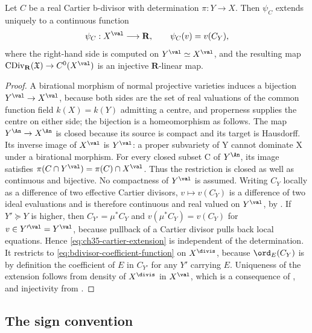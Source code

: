 \begin{proposition}
\label{prop:ch35-cartier-continuous-extension}
Let $C$ be a real Cartier b-divisor with determination
$\pi:Y\to X$.  Then $\psi_C$ extends uniquely to a continuous function
\begin{equation}
\label{eq:ch35-cartier-extension}
 \psi_C:X^{\val}\longrightarrow\mathbf R,
 \qquad
 \psi_C(v)=v(C_Y),
\end{equation}
where the right-hand side is computed on $Y^{\val}\simeq X^{\val}$, and
the resulting map
$\operatorname{CDiv}_{\mathbf R}(\mathfrak X)\to C^0(X^{\val})$ is an
injective $\mathbf R$-linear map.
\end{proposition}

\begin{proof}
A birational morphism of normal projective varieties induces a bijection
$Y^{\val}\to X^{\val}$, because both sides are the set of real valuations
of the common function field $k(X)=k(Y)$ admitting a centre, and
properness supplies the centre on either side; the bijection is a homeomorphism as follows. The map
$Y^{\An}\to X^{\An}$ is closed because its source is compact and its
target is Hausdorff. Its inverse image of $X^{\val}$ is $Y^{\val}$:
a proper subvariety of Y cannot dominate X under a birational morphism.
For every closed subset C of $Y^{\An}$, its image satisfies
$\pi(C\cap Y^{\val})=\pi(C)\cap X^{\val}$. Thus the restriction is
closed as well as continuous and bijective. No compactness of
$Y^{\val}$ is assumed.  Writing $C_Y$ locally as a
difference of two effective Cartier divisors, $v\mapsto v(C_Y)$ is a
difference of two ideal evaluations and is therefore continuous and real
valued on $Y^{\val}$, by
.  If $Y'\succeq Y$ is higher, then
$C_{Y'}=\mu^*C_Y$ and $v(\mu^*C_Y)=v(C_Y)$ for
$v\in Y'^{\val}=Y^{\val}$, because pullback of a Cartier divisor pulls
back local equations.  Hence \eqref{eq:ch35-cartier-extension} is
independent of the determination.  It restricts to
\eqref{eq:bdivisor-coefficient-function} on $X^{\divis}$, because
$\ord_E(C_Y)$ is by definition the coefficient of $E$ in
$C_{Y'}$ for any $Y'$ carrying $E$.  Uniqueness of the extension
follows from density of $X^{\divis}$ in $X^{\val}$, which is a
consequence of , and injectivity from
.
\end{proof}

\subsection{The sign convention}
\label{sec:ch35-sign}

